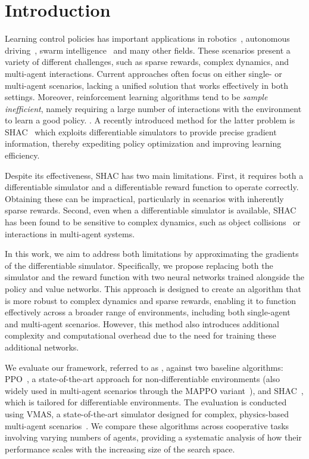 \section{Introduction}\label{sect:introduction}

Learning control policies has important applications in robotics~\cite{Singh22}, autonomous driving~\cite{Elallid22}, swarm intelligence~\cite{Tang21} and many other fields. These scenarios present a variety of different challenges, such as sparse rewards, complex dynamics, and multi-agent interactions. Current approaches often focus on either single- or multi-agent scenarios, lacking a unified solution that works effectively in both settings. Moreover, reinforcement learning algorithms tend to be \emph{sample inefficient}, namely requiring a large number of interactions with the environment to learn a good policy.
\texttt{\color{DarkOrchid}{<- FB: non mi è super chiara questa frase}}. A recently introduced method for the latter problem is SHAC~\cite{Xu22} which exploits differentiable simulators to provide precise gradient information, thereby expediting policy optimization and improving learning efficiency.

Despite its effectiveness, SHAC has two main limitations. First, it requires both a differentiable simulator and a differentiable reward function to operate correctly. Obtaining these can be impractical, particularly in scenarios with inherently sparse rewards. Second, even when a differentiable simulator is available, SHAC has been found to be sensitive to complex dynamics, such as object collisions~\cite{Georgiev24} or interactions in multi-agent systems.

In this work, we aim to address both limitations by approximating the gradients of the differentiable simulator. Specifically, we propose replacing both the simulator and the reward function with two neural networks trained alongside the policy and value networks. This approach is designed to create an algorithm that is more robust to complex dynamics and sparse rewards, enabling it to function effectively across a broader range of environments, including both single-agent and multi-agent scenarios. However, this method also introduces additional complexity and computational overhead due to the need for training these additional networks.

We evaluate our framework, referred to as \fname{}, against two baseline algorithms: PPO~\cite{Schulman17}, a state-of-the-art approach for non-differentiable environments (also widely used in multi-agent scenarios through the MAPPO variant~\cite{DBLP:conf/nips/YuVVGWBW22}), and SHAC~\cite{Xu22}, which is tailored for differentiable environments. The evaluation is conducted using VMAS, a state-of-the-art simulator designed for complex, physics-based multi-agent scenarios~\cite{DBLP:conf/dars/BettiniKBP22}. We compare these algorithms across cooperative tasks involving varying numbers of agents, providing a systematic analysis of how their performance scales with the increasing size of the search space.


